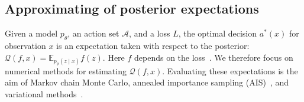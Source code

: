 
\subsection{Approximating of posterior expectations}
\label{ss:posterior_approx}
Given a model $p_\theta$, an action set $\mathcal{A}$, and a loss $L$, the optimal decision $a^*(x)$ for observation $x$ is an expectation taken with respect to the posterior:
\(
    \mathcal{Q}(f, x) = \mathbb{E}_{p_\theta(z \mid x)}f(z).
\)
Here $f$ depends on the loss~\cite{Fienberg}. We therefore focus on numerical methods for estimating $\mathcal{Q}(f, x)$. Evaluating these expectations is the aim of Markov chain Monte Carlo, annealed importance sampling (AIS)~\cite{neal2001annealed}, and variational methods~\cite{NIPS2018_7699}. 

